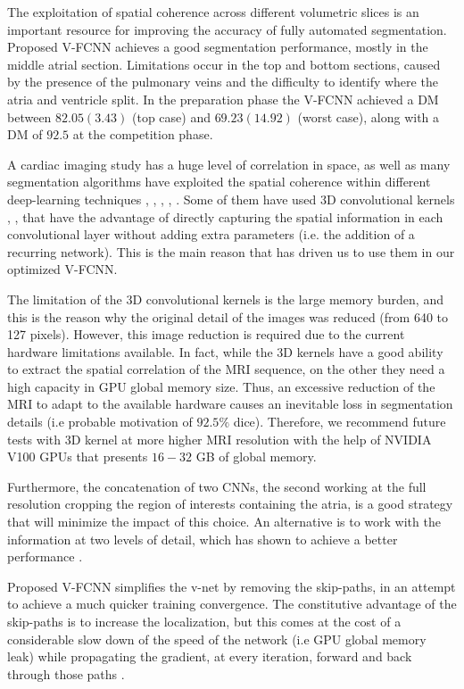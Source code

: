 \documentclass{llncs}
\begin{document}
The exploitation of spatial coherence across different volumetric slices is an important resource for improving the accuracy of fully automated segmentation. Proposed V-FCNN achieves a good segmentation performance, mostly in the middle atrial section. Limitations occur in the top and bottom sections, caused by the presence of the pulmonary veins and the difficulty to identify where the atria and ventricle split. In the preparation phase the V-FCNN  achieved a DM between $82.05 (3.43)$ (top case) and $69.23 (14.92)$ (worst case), along with a DM of $92.5$ at the competition phase.

A cardiac imaging study has a huge level of correlation in space, as well as many segmentation algorithms have exploited the spatial coherence within different deep-learning techniques \cite{Fausto}, \cite{Isensee}, \cite{Hinrich}, \cite{Poudel}, \cite{Jianxu}. Some of them have used 3D convolutional kernels \cite{Fausto}, \cite{Isensee}, \cite{Hinrich} that have the advantage of directly capturing the spatial information in each convolutional layer without adding extra parameters (i.e. the addition of a recurring network). This is the main reason that has driven us to use them in our optimized V-FCNN.

The limitation of the 3D convolutional kernels is the large memory burden, and this is the reason why the original detail of the images was reduced (from 640 to 127 pixels).
However, this image reduction is required due to the current hardware limitations available. In fact, while the 3D kernels have a good ability to extract the spatial correlation of the MRI sequence, on the other they need a high capacity in GPU global memory size.
Thus, an excessive reduction of the MRI to adapt to the available hardware causes an inevitable
loss in segmentation details (i.e probable motivation of $92.5 \%$ dice).
Therefore, we recommend future tests with 3D kernel at more higher MRI resolution with the help
of NVIDIA V100 GPUs \cite{ZheJia} that presents $16-32$ GB of global memory.

Furthermore, the concatenation of two CNNs, the second working at the full resolution cropping the region of interests containing the atria, is a good strategy that will minimize the impact of this choice. An alternative is to work with the information at two levels of detail, which has shown to achieve a better performance \cite{Zhaohan}.

Proposed V-FCNN simplifies the v-net \cite{Fausto} by removing the skip-paths, in an attempt to achieve a much quicker training convergence. The constitutive advantage of the skip-paths is to increase the localization, but this comes at the cost of a considerable slow down of the speed of the network (i.e GPU global memory leak) while propagating the gradient, at every iteration, forward and back through those paths \cite{AdamPaszke}.
\end{document}
